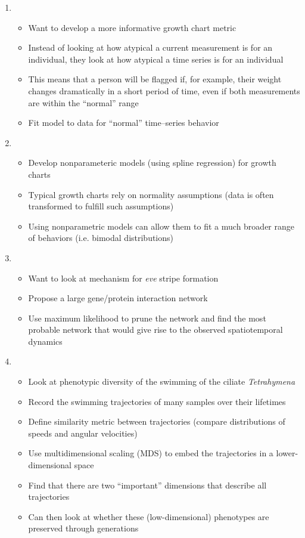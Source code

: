 \documentclass[12pt]{article}
\begin{document}
\begin{enumerate}

\item {}
\begin{itemize}
		\item Want to develop a more informative growth chart metric
		\item Instead of looking at how atypical a current measurement is for an individual, they look at how atypical a time series is for an individual 
		\item This means that a person will be flagged if, for example, their weight changes dramatically in a short period of time, even if both measurements are within the ``normal'' range
		\item Fit model to data for ``normal'' time--series behavior
\end{itemize}

\item {}
\begin{itemize}
	\item Develop nonparameteric models (using spline regression) for growth charts
	\item Typical growth charts rely on normality assumptions (data is often transformed to fulfill such assumptions)
	\item Using nonparametric models can allow them to fit a much broader range of behaviors (i.e. bimodal distributions)
\end{itemize}

\item {}
\begin{itemize}
	\item Want to look at mechanism for {\em eve} stripe formation
	\item Propose a large gene/protein interaction network
	\item Use maximum likelihood to prune the network and find the most probable network that would give rise to the observed spatiotemporal dynamics
\end{itemize}

\item {}
\begin{itemize}
	\item Look at phenotypic diversity of the swimming of the ciliate {\em Tetrahymena}
	\item Record the swimming trajectories of many samples over their lifetimes
	\item Define similarity metric between trajectories (compare distributions of speeds and angular velocities)
	\item Use multidimensional scaling (MDS) to embed the trajectories in a lower-dimensional space
	\item Find that there are two ``important'' dimensions that describe all trajectories
	\item Can then look at whether these (low-dimensional) phenotypes are preserved through generations
\end{itemize}


\end{enumerate}
\end{document}
